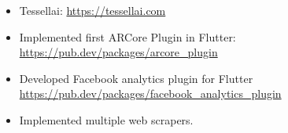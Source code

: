\begin{itemize}
\item Tessellai:
\url{https://tessellai.com}
\newline
{}
\item Implemented first ARCore Plugin in Flutter:
\url{https://pub.dev/packages/arcore_plugin}
\newline
{}
\item Developed Facebook analytics plugin for Flutter
\url{https://pub.dev/packages/facebook_analytics_plugin}
\newline
{}
\item{Implemented multiple web scrapers.}
\newline
{}


\end{itemize}
